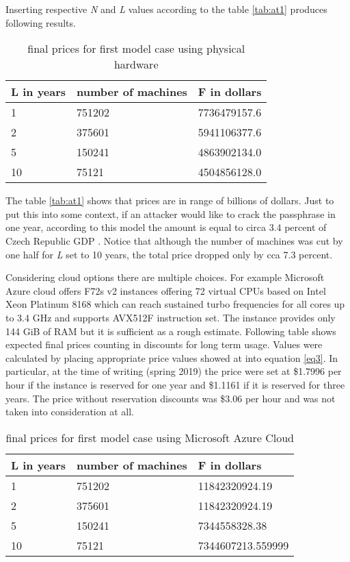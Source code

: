 \documentclass[nolof]{fithesis3}
\begin{document}
Inserting respective \emph{N} and \emph{L} values according to the table \ref{tab:at1} produces following results.

\noindent
\begin{table}
\caption{final prices for first model case using physical hardware}
\label{tab:at2}
\begin{tabularx}{\textwidth}{| X | X | X |}
\hline
L  in years & number of machines & F in dollars\\
\hline
1 & 751202 & 7736479157.6\\
\hline
2 & 375601  & 5941106377.6\\
\hline
5 & 150241 & 4863902134.0\\
\hline
10 & 75121 & 4504856128.0\\
\hline
\end{tabularx}
\end{table}

The table \ref{tab:at1} shows that prices are in range of billions of dollars. Just to put this into some context, if an attacker would like to crack the passphrase in one year, according to this model the amount is equal to circa 3.4 percent of Czech Republic GDP \parencite{czechgdp}. Notice that although the number of machines was cut by one half for \emph{L} set to 10 years, the total price dropped only by cca 7.3 percent.

Considering cloud options there are multiple choices. For example Microsoft Azure cloud offers F72s v2 instances offering 72 virtual CPUs based on Intel Xeon Platinum 8168 which can reach sustained turbo frequencies for all cores up to 3.4 GHz and supports AVX512F instruction set. The instance provides only 144 GiB of RAM but it is sufficient as a rough estimate. Following table shows expected final prices counting in discounts for long term usage. Values were calculated by placing appropriate price values showed at \parencite{azure} into equation \ref{eq3}. In particular, at the time of writing (spring 2019) the price were set at \$1.7996 per hour if the instance is reserved for one year and \$1.1161 if it is reserved for three years. The price without reservation discounts was \$3.06 per hour and was not taken into consideration at all.

\noindent
\begin{table}
\caption{final prices for first model case using Microsoft Azure Cloud}
\label{tab:at3}
\begin{tabularx}{\textwidth}{| X | X | X |}
\hline
L  in years & number of machines & F in dollars\\
\hline
1 & 751202 & 11842320924.19\\
\hline
2 & 375601 & 11842320924.19\\
\hline
5 & 150241 & 7344558328.38\\
\hline
10 & 75121 & 7344607213.559999\\
\hline
\end{tabularx}
\end{table}
\end{document}
